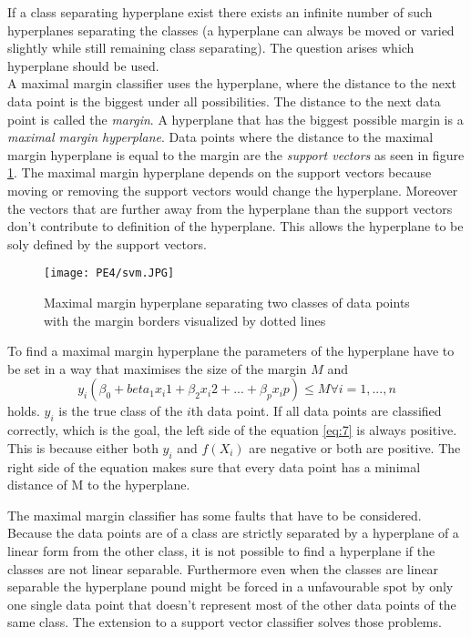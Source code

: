 If a class separating hyperplane exist there exists an infinite number of such hyperplanes separating the classes (a hyperplane can always be moved or varied slightly while still remaining class separating). The question arises which hyperplane should be used. 
\\
A maximal margin classifier uses the hyperplane, where the distance to the next data point  is the biggest under all possibilities. The distance to the next data point is called the \emph{margin}. A hyperplane that has the biggest possible margin is a \emph{maximal margin hyperplane}. Data points where the distance to the maximal margin hyperplane is equal to the margin are the \emph{support vectors} as seen in figure \ref{fig:mmh}. The maximal margin hyperplane depends on the support vectors because moving or removing the support vectors would change the hyperplane. Moreover the vectors that are further away from the hyperplane than the support vectors don't contribute to definition of the hyperplane. This allows the hyperplane to be soly defined by the support vectors.\\

\begin{figure}[h]
\centering
\texttt{[image: PE4/svm.JPG]}
\caption{Maximal margin hyperplane separating two classes of data points with the margin borders visualized by dotted lines}
\label{fig:mmh}
\end{figure}

To find a maximal margin hyperplane the parameters of the hyperplane have to be set in a way that maximises the size of the margin $M$ and
\begin{equation} \label{eq:7}
y_i(\beta_0+beta_1 x_i1 +\beta_2 x_i2 + ... +\beta_p x_ip) \leq M   \forall i=1,...,n
\end{equation}
holds.
$y_i$ is the true class of the $i$th data point. If all data points are classified correctly, which is the goal, the left side of the equation \ref{eq:7} is always positive. This is because either both $y_i$ and $f(X_i)$ are negative or both are positive. The right side of the equation makes sure that every data point has a minimal distance of M to the hyperplane.

The maximal margin classifier has some faults that have to be considered. Because the data points are of a class are strictly separated by a hyperplane of a linear form from the other class, it is not possible to find a hyperplane if the classes are not linear separable.  Furthermore even when the classes are linear separable the hyperplane pound might be forced in a unfavourable spot by only one single data point that doesn't represent most of the other data points of the same class. The extension to a support vector classifier solves those problems.

